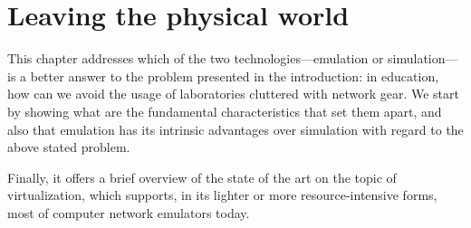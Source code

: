 
\chapter{Leaving the physical world}
\label{ch:leavingthephysicalworld}

This chapter addresses which of the two technologies---emulation or simulation---is a better answer to the problem presented in the introduction:
in education, how can we avoid the usage of laboratories cluttered with network gear.
We start by showing what are the fundamental characteristics that set them apart, and also that emulation has its intrinsic advantages over simulation with regard to the above stated problem.

Finally, it offers a brief overview of the state of the art on the topic of virtualization, which supports, in its lighter or more resource-intensive forms, most of computer network emulators today.







